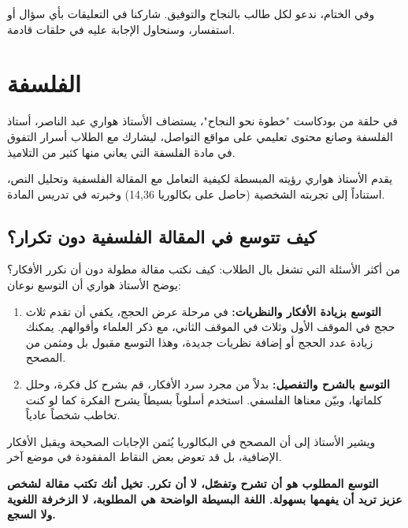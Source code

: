 \documentclass[12pt,a4paper]{book}
\newcommand{\importantAr}[1]{%
	\begin{important}
		\bfseries #1
	\end{important}
}
\begin{document}
	وفي الختام، ندعو لكل طالب بالنجاح والتوفيق. شاركنا في التعليقات بأي سؤال أو استفسار، وسنحاول الإجابة عليه في حلقات قادمة.
	
	


\section{ الفلسفة }

في حلقة من بودكاست "خطوة نحو النجاح"، يستضاف الأستاذ هواري عبد الناصر، أستاذ الفلسفة وصانع محتوى تعليمي على مواقع التواصل، ليشارك مع الطلاب أسرار التفوق في مادة الفلسفة التي يعاني منها كثير من التلاميذ.

يقدم الأستاذ هواري رؤيته المبسطة لكيفية التعامل مع المقالة الفلسفية وتحليل النص، استناداً إلى تجربته الشخصية (حاصل على بكالوريا 14,36) وخبرته في تدريس المادة.

\subsection{كيف تتوسع في المقالة الفلسفية دون تكرار؟}

من أكثر الأسئلة التي تشغل بال الطلاب: كيف نكتب مقالة مطولة دون أن نكرر الأفكار؟ يوضح الأستاذ هواري أن التوسع نوعان:

\begin{enumerate}
	\item \textbf{التوسع بزيادة الأفكار والنظريات:} في مرحلة عرض الحجج، يكفي أن تقدم ثلاث حجج في الموقف الأول وثلاث في الموقف الثاني، مع ذكر العلماء وأقوالهم. يمكنك زيادة عدد الحجج أو إضافة نظريات جديدة، وهذا التوسع مقبول بل ومثمن من المصحح.
	\item \textbf{التوسع بالشرح والتفصيل:} بدلاً من مجرد سرد الأفكار، قم بشرح كل فكرة، وحلل كلماتها، وبيّن معناها الفلسفي. استخدم أسلوباً بسيطاً يشرح الفكرة كما لو كنت تخاطب شخصاً عادياً.
\end{enumerate}

ويشير الأستاذ إلى أن المصحح في البكالوريا يُثمن الإجابات الصحيحة ويقبل الأفكار الإضافية، بل قد تعوض بعض النقاط المفقودة في موضع آخر.

\importantAr{التوسع المطلوب هو أن تشرح وتفصّل، لا أن تكرر. تخيل أنك تكتب مقالة لشخص عزيز تريد أن يفهمها بسهولة. اللغة البسيطة الواضحة هي المطلوبة، لا الزخرفة اللغوية ولا السجع.}
\end{document}
